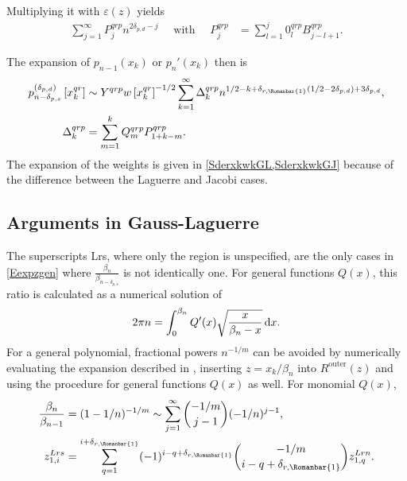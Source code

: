 \documentclass[11pt]{article}
\newcommand*{\todo}[1]{{\color{red}?? TODO: #1 ??}}
\renewcommand{\O}{{\operatorname{outer}}}
\newcommand{\qg}{q}
\newcommand{\ql}{L}
\newcommand{\rg}{r}
\newcommand{\rb}{{\scriptsize \Romanbar{1}} }
\newcommand{\pg}{p}
\newcommand{\pn}{n}
\newcommand{\pd}{d}
\newcommand{\ps}{s}
\numberwithin{equation}{section}
\begin{document}
Multiplying it with $\varepsilon(z)$ yields 
\begin{align}
	\sum_{j=1}^\infty P_j^{\qg\rg\pg} n^{2\delta_{\pg,\pd} -j} \quad \text{  with  } \quad P_j^{\qg\rg\pg} & = \sum_{l=1}^j 0_l^{\qg\rg\pg} B_{j-l+1}^{\qg\rg\pg}.
\end{align}

The expansion of $p_{n-1}(x_k)$ or $p_{n}'(x_k)$ then is
\begin{align}
	p_{n-\delta_{\pg,\ps} }^{(\delta_{\pg,\pd})} \left[x_k^{\qg\rg}\right] & \sim Y^{\qg\rg\pg} w\left[x_k^{\qg\rg}\right]^{-1/2} \sum_{k=1}^\infty \Delta_k^{\qg\rg\pg} n^{1/2-k +\delta_{\rg,\rb}\left(1/2 - 2\delta_{\pg,\pd} \right) +3\delta_{\pg,\pd} }, \\ 
	\Delta_k^{\qg\rg\pg} & = \sum_{m=1}^k Q_m^{\qg\rg\pg} P_{1+k-m}^{\qg\rg\pg}.
\end{align}
The expansion of the weights is given in \cref{SderxkwkGL,SderxkwkGJ} because of the difference between the Laguerre and Jacobi cases. %





\subsection{Arguments in Gauss-Laguerre} \label{SexpGL}

The superscripts \ql\rg\ps, where only the region is unspecified, are the only cases in \cref{Eexpzgen} where $\tfrac{\beta_n}{\beta_{n-\delta_{p,s}}}$ is not identically one. For general functions $Q(x)$, this ratio is calculated as a numerical solution of %
\begin{equation}
 2\pi n = \int_0^{\beta_n} Q'(x) \sqrt{ \frac{x}{\beta_n - x} } \, {\rm d} x.\label{EbetaInt}
\end{equation}
For a general polynomial, fractional powers $n^{-1/m}$ can be avoided by numerically evaluating the expansion described in \cite[\S 3.2]{laguerre}, %
inserting $z=x_k/\beta_n$ into $R^{\O}(z)$ and using the procedure for general functions $Q(x)$ as well. For monomial $Q(x)$, 
\begin{align}	
	\frac{\beta_n}{\beta_{n-1}} & = (1-1/n)^{-1/m} \sim \sum_{j=1}^\infty {-1/m \choose j-1} (-1/n)^{j-1}, \\ 
	z_{1,i}^{\ql\rg\ps} & = \sum_{q=1}^{i+\delta_{\rg,\rb} } (-1)^{i-q+\delta_{\rg,\rb}} {-1/m \choose i-q+\delta_{\rg,\rb}} z_{1,q}^{\ql\rg\pn}.
\end{align}
\end{document}
